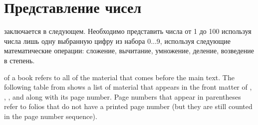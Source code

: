 \chapter{Представление чисел}
\label{ch:need_to_think}

 заключается в следующем. Необходимо представить числа от 1 до 100 используя числа лишь одну выбранную цифру 
из набора 0...9, используя следующие математические операции: сложение, вычитание, умножение, деление, возведение в степень. 

 of a book refers to all of the material that
comes before the main text.  The following table from shows a list of
material that appears in the front matter of \VDQI, \EI, \VE, and \BE
along with its page number.  Page numbers that appear in parentheses refer
to folios that do not have a printed page number (but they are still
counted in the page number sequence).
